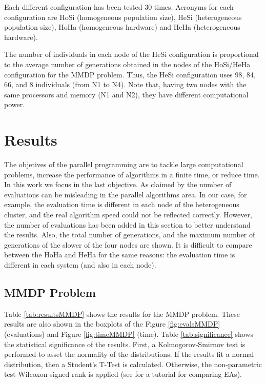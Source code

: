 \documentclass{sig-alternate}
\begin{document}
Each different configuration has been tested 30 times. Acronyms for each configuration are HoSi (homogeneous population size), HeSi (heterogeneous population size), HoHa (homogeneous hardware) and HeHa (heterogeneous hardware). 

The number of individuals in each node of the HeSi configuration is proportional to the average number of generations obtained in the nodes of the HoSi/HeHa configuration for the MMDP problem. Thus, the HeSi configuration uses 98, 84, 66, and 8 individuals (from N1 to N4). Note that, having two nodes with the same processors and memory (N1 and N2), they have different computational power.

\section{Results}
\label{sec:results}

The objetives of the parallel programming are to tackle large computational problems, increase the performance of algorithms in a finite time, or reduce time. In this work we focus in the last objective.
As claimed by \cite{EVALUATIONPARALLEL} the number of evaluations can be misleading in the parallel algorithms area. In our case, for example, the evaluation time is different in each node of the heterogeneous cluster, and the real algorithm speed could not be reflected correctly. However, the number of evaluations has been added in this section to better understand the results. Also, the total number of generations, and the maximum number of generations of the slower of the four nodes are shown. It is difficult to compare between the HoHa and HeHa for the same reasons: the evaluation time is different in each system (and also in each node).

\subsection{MMDP Problem}

Table \ref{tab:resultsMMDP} shows the results for the MMDP problem. These results are also shown in the boxplots of the Figure \ref{fig:evalsMMDP} (evaluations) and Figure \ref{fig:timeMMDP} (time). Table \ref{tab:significance} shows the statistical significance of the results. First, a Kolmogorov-Smirnov test is performed to asset the normality of the distributions. If the results fit a normal distribution, then a Student's T-Test is calculated. Otherwise, the non-parametric test Wilcoxon signed rank is applied (see \cite{TUTORIAL} for a tutorial for comparing EAs).
\end{document}
